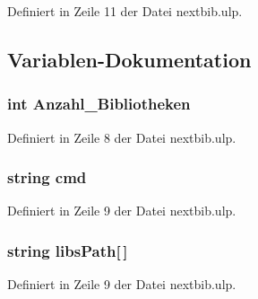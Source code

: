 Definiert in Zeile 11 der Datei nextbib.\+ulp.



\subsection{Variablen-\/\+Dokumentation}
\hypertarget{nextbib_8ulp_a05eb6bad20cdfdea1ba3832f8fbca9a4}{}
\subsubsection[{Anzahl\+\_\+\+Bibliotheken}]{\setlength{\rightskip}{0pt plus 5cm}int Anzahl\+\_\+\+Bibliotheken}\label{nextbib_8ulp_a05eb6bad20cdfdea1ba3832f8fbca9a4}


Definiert in Zeile 8 der Datei nextbib.\+ulp.

\hypertarget{nextbib_8ulp_a90e155eddac72ef87020b85a704d97be}{}
\subsubsection[{cmd}]{\setlength{\rightskip}{0pt plus 5cm}string cmd}\label{nextbib_8ulp_a90e155eddac72ef87020b85a704d97be}


Definiert in Zeile 9 der Datei nextbib.\+ulp.

\hypertarget{nextbib_8ulp_ab50ee1dbefcf5a146f47b47945acaf6b}{}
\subsubsection[{libs\+Path}]{\setlength{\rightskip}{0pt plus 5cm}string libs\+Path\mbox{[}$\,$\mbox{]}}\label{nextbib_8ulp_ab50ee1dbefcf5a146f47b47945acaf6b}


Definiert in Zeile 9 der Datei nextbib.\+ulp.

